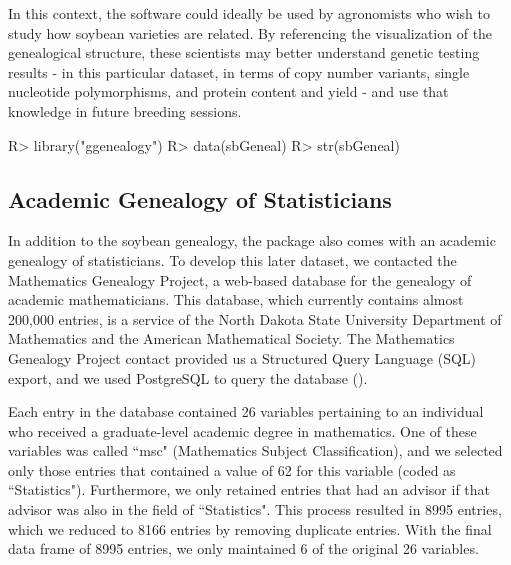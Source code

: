 \documentclass[article,shortnames]{jss}
\begin{document}
In this context, the software could ideally be used by agronomists who wish to study how soybean varieties are related. By referencing the visualization of the genealogical structure, these scientists may better understand genetic testing results - in this particular dataset, in terms of copy number variants, single nucleotide polymorphisms, and protein content and yield - and use that knowledge in future breeding sessions.

\begin{CodeChunk}
\begin{CodeInput}
R> library("ggenealogy")
R> data(sbGeneal)
R> str(sbGeneal)
\end{CodeInput}
\end{CodeChunk}

\subsection{Academic Genealogy of Statisticians}

In addition to the soybean genealogy, the  package also comes with an academic genealogy of statisticians. To develop this later dataset, we contacted the Mathematics Genealogy Project, a web-based database for the genealogy of academic mathematicians. This database, which currently contains almost 200,000 entries, is a service of the North Dakota State University Department of Mathematics and the American Mathematical Society. The Mathematics Genealogy Project contact provided us a Structured Query Language (SQL) export, and we used PostgreSQL to query the database (\citealt{psql}).

Each entry in the database contained 26 variables pertaining to an individual who received a graduate-level academic degree in mathematics. One of these variables was called ``msc" (Mathematics Subject Classification), and we selected only those entries that contained a value of 62 for this variable (coded as ``Statistics"). Furthermore, we only retained entries that had an advisor if that advisor was also in the field of ``Statistics". This process resulted in 8995 entries, which we reduced to 8166 entries by removing duplicate entries. With the final data frame of 8995 entries, we only maintained 6 of the original 26 variables.
\end{document}
